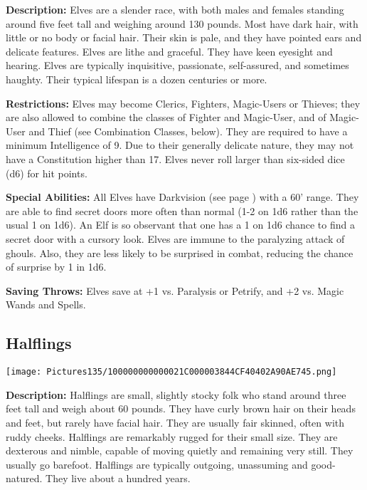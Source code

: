 \documentclass[a4paper,twoside,openany,10pt]{book}
\begin{document}
\begin{multicols}{2}
\textbf{Description:}
Elves are a slender race, with both males and females standing around five feet tall and weighing around 130 pounds. Most have dark hair, with little or no body or facial hair. Their skin is pale, and they have pointed ears and delicate features. Elves are lithe and graceful. They have keen eyesight and hearing. Elves are typically inquisitive, passionate, self-assured, and sometimes haughty. Their typical lifespan is a dozen centuries or more.

\textbf{Restrictions: } Elves may become Clerics, Fighters, Magic-Users or Thieves; they are also allowed to combine the classes of Fighter and Magic-User, and of Magic-User and Thief (see Combination Classes, below). They are required to have a minimum Intelligence of 9. Due to their generally delicate nature, they may not have a Constitution higher than 17. Elves never roll larger than six-sided dice (d6) for hit points.

\textbf{Special Abilities: }All Elves have Darkvision (see page \hyperlink{darkvision}{\pageref{darkvision}}) with a 60'{} range. They are able to find secret doors more often than normal (1-2 on 1d6 rather than the usual 1 on 1d6). An Elf is so observant that one has a 1 on 1d6 chance to find a secret door with a cursory look. Elves are immune to the paralyzing attack of ghouls. Also, they are less likely to be surprised in combat, reducing the chance of surprise by 1 in 1d6.

\textbf{Saving Throws: } Elves save at +1 vs. Paralysis or Petrify, and
+2 vs. Magic Wands and Spells.

\subsection{Halflings}\label{halflings}

\begin{center}
	\texttt{[image: Pictures135/100000000000021C000003844CF40402A90AE745.png]}
\end{center}\medskip

\textbf{Description:}
Halflings are small, slightly stocky folk who stand around three feet tall and weigh about 60 pounds. They have curly brown hair on their heads and feet, but rarely have facial hair. They are usually fair skinned, often with ruddy cheeks. Halflings are remarkably rugged for their small size. They are dexterous and nimble, capable of moving quietly and remaining very still. They usually go barefoot. Halflings are typically outgoing, unassuming and good-natured. They live about a hundred years.


\end{multicols}
\end{document}
